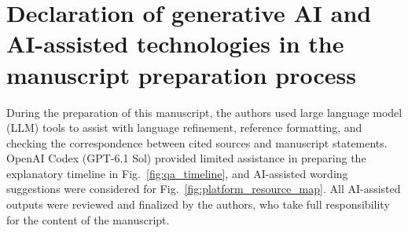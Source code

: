\documentclass[a4paper,fleqn]{cas-dc}
\begin{document}
\section*{Declaration of generative AI and AI-assisted technologies in the
manuscript preparation process}
During the preparation of this manuscript, the authors used large language model
(LLM) tools to assist with language refinement, reference formatting, and checking
the correspondence between cited sources and manuscript statements. OpenAI Codex
(GPT-6.1 Sol) provided limited assistance in preparing the explanatory timeline
in Fig.~\ref{fig:qa_timeline}, and AI-assisted wording suggestions were considered
for Fig.~\ref{fig:platform_resource_map}. All AI-assisted outputs were reviewed
and finalized by the authors, who take full responsibility for the content of
the manuscript.

\printbibliography
\end{document}
